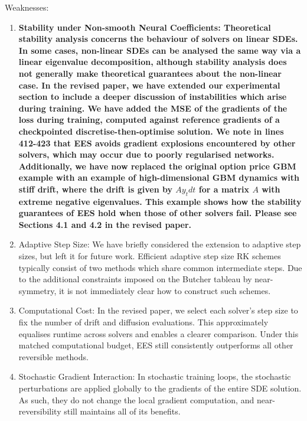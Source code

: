 \documentclass{article}
\newcommand{\NEW}[1]{\color{maroon}\textbf{{#1}}\color{black}}
\begin{document}
Weaknesses:
\begin{enumerate}
    \item \NEW{Stability under Non-smooth Neural Coefficients: Theoretical stability analysis concerns the behaviour of solvers on linear SDEs. In some cases, non-linear SDEs can be analysed the same way via a linear eigenvalue decomposition, although stability analysis does not generally make theoretical guarantees about the non-linear case. In the revised paper, we have extended our experimental section to include a deeper discussion of instabilities which arise during training. We have added the MSE of the gradients of the loss during training, computed against reference gradients of a checkpointed discretise-then-optimise solution. We note in lines 412-423 that EES avoids gradient explosions encountered by other solvers, which may occur due to poorly regularised networks. Additionally, we have now replaced the original option price GBM example with an example of high-dimensional GBM dynamics with stiff drift, where the drift is given by $A y_t dt$ for a matrix $A$ with extreme negative eigenvalues. This example shows how the stability guarantees of EES hold when those of other solvers fail. Please see Sections 4.1 and 4.2 in the revised paper.}
    \item Adaptive Step Size: We have briefly considered the extension to adaptive step sizes, but left it for future work. Efficient adaptive step size RK schemes typically consist of two methods which share common intermediate steps. Due to the additional constraints imposed on the Butcher tableau by near-symmetry, it is not immediately clear how to construct such schemes.
    \item Computational Cost: In the revised paper, we select each solver’s step size to fix the number of drift and diffusion evaluations. This approximately equalises runtime across solvers and enables a clearer comparison. Under this matched computational budget, EES still consistently outperforms all other reversible methods.
    \item Stochastic Gradient Interaction: In stochastic training loops, the stochastic perturbations are applied globally to the gradients of the entire SDE solution. As such, they do not change the local gradient computation, and near-reversibility still maintains all of its benefits.

\end{enumerate}
\end{document}

